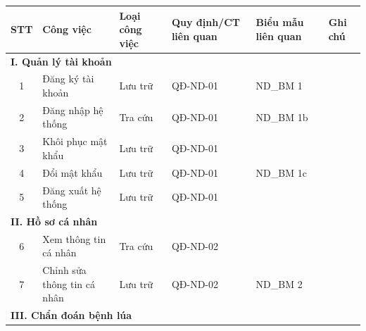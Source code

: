 \documentclass[12pt,a4paper]{article}
\begin{document}
\begin{longtable}{|
        c|
        >{\raggedright\arraybackslash}p{3.2cm}|
        >{\raggedright\arraybackslash}p{2.2cm}|
        >{\raggedright\arraybackslash}p{2.4cm}|
        >{\raggedright\arraybackslash}p{2.6cm}|
        >{\raggedright\arraybackslash}p{2.6cm}|}
    \hline
    \rowcolor{headerblue}
    \textbf{STT} & \textbf{Công việc}               & \textbf{Loại công việc} & \textbf{Quy định/CT liên quan} & \textbf{Biểu mẫu liên quan} & \textbf{Ghi chú}         \\
    \hline
    \endhead
    \multicolumn{6}{|l|}{\cellcolor{notegreen}\textbf{I. Quản lý tài khoản}}                                                                                            \\
    \hline
    1            & Đăng ký tài khoản                & Lưu trữ                 & QĐ-ND-01                       & ND\_BM 1                    &                          \\
    \hline
    2            & Đăng nhập hệ thống               & Tra cứu                 & QĐ-ND-01                       & ND\_BM 1b                   &                          \\
    \hline
    3            & Khôi phục mật khẩu               & Lưu trữ                 & QĐ-ND-01                       &                             &                          \\
    \hline
    4            & Đổi mật khẩu                     & Lưu trữ                 & QĐ-ND-01                       & ND\_BM 1c                   &                          \\
    \hline
    5            & Đăng xuất hệ thống               & Lưu trữ                 & QĐ-ND-01                       &                             &                          \\
    \hline
    \multicolumn{6}{|l|}{\cellcolor{notegreen}\textbf{II. Hồ sơ cá nhân}}                                                                                               \\
    \hline
    6            & Xem thông tin cá nhân            & Tra cứu                 & QĐ-ND-02                       &                             &                          \\
    \hline
    7            & Chỉnh sửa thông tin cá nhân      & Lưu trữ                 & QĐ-ND-02                       & ND\_BM 2                    &                          \\
    \hline
    \multicolumn{6}{|l|}{\cellcolor{notegreen}\textbf{III. Chẩn đoán bệnh lúa}}                                                                                         \\

\end{longtable}
\end{document}
